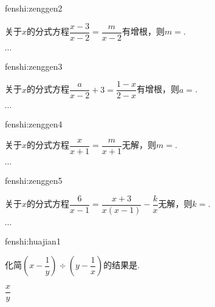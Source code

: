 \begin{defproblem}{fenshi:zenggen2}%
\begin{onlyproblem}%
关于$x$的分式方程$\dfrac{x-3}{x-2}=\dfrac{m}{x-2}$有增根，则$m=$\underline{\hspace*{2cm}}.
\end{onlyproblem}%
\begin{onlysolution}%
$\cdots$
\end{onlysolution}%
\end{defproblem}


\begin{defproblem}{fenshi:zenggen3}%
\begin{onlyproblem}%
关于$x$的分式方程$\dfrac{a}{x-2}+3=\dfrac{1-x}{2-x}$有增根，则$a=$\underline{\hspace*{2cm}}.
\end{onlyproblem}%
\begin{onlysolution}%
$\cdots$
\end{onlysolution}%
\end{defproblem}


\begin{defproblem}{fenshi:zenggen4}%
\begin{onlyproblem}%
关于$x$的分式方程$\dfrac{x}{x+1}=\dfrac{m}{x+1}$无解，则$m=$\underline{\hspace*{2cm}}.
\end{onlyproblem}%
\begin{onlysolution}%
$\cdots$
\end{onlysolution}%
\end{defproblem}


\begin{defproblem}{fenshi:zenggen5}%
\begin{onlyproblem}%
关于$x$的分式方程$\dfrac{6}{x-1}=\dfrac{x+3}{x(x-1)}-\dfrac{k}{x}$无解，则$k=$\underline{\hspace*{2cm}}.
\end{onlyproblem}%
\begin{onlysolution}%
$\cdots$
\end{onlysolution}%
\end{defproblem}



\begin{defproblem}{fenshi:huajian1}%
\begin{onlyproblem}%
化简$\left(x-\dfrac{1}{y}\right)\div\left(y-\dfrac{1}{x}\right)$的结果是\underline{\hspace*{1cm}}.
\end{onlyproblem}%
\begin{onlysolution}%
$\dfrac{x}{y}$
\end{onlysolution}%
\end{defproblem}


